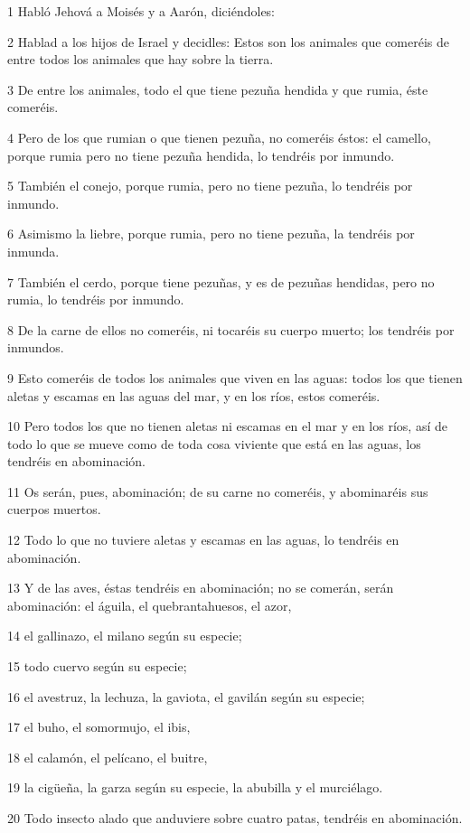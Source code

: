 \par 1 Habló Jehová a Moisés y a Aarón, diciéndoles:
\par 2 Hablad a los hijos de Israel y decidles: Estos son los animales que comeréis de entre todos los animales que hay sobre la tierra.
\par 3 De entre los animales, todo el que tiene pezuña hendida y que rumia, éste comeréis.
\par 4 Pero de los que rumian o que tienen pezuña, no comeréis éstos: el camello, porque rumia pero no tiene pezuña hendida, lo tendréis por inmundo.
\par 5 También el conejo, porque rumia, pero no tiene pezuña, lo tendréis por inmundo.
\par 6 Asimismo la liebre, porque rumia, pero no tiene pezuña, la tendréis por inmunda.
\par 7 También el cerdo, porque tiene pezuñas, y es de pezuñas hendidas, pero no rumia, lo tendréis por inmundo.
\par 8 De la carne de ellos no comeréis, ni tocaréis su cuerpo muerto; los tendréis por inmundos.
\par 9 Esto comeréis de todos los animales que viven en las aguas: todos los que tienen aletas y escamas en las aguas del mar, y en los ríos, estos comeréis.
\par 10 Pero todos los que no tienen aletas ni escamas en el mar y en los ríos, así de todo lo que se mueve como de toda cosa viviente que está en las aguas, los tendréis en abominación.
\par 11 Os serán, pues, abominación; de su carne no comeréis, y abominaréis sus cuerpos muertos.
\par 12 Todo lo que no tuviere aletas y escamas en las aguas, lo tendréis en abominación.
\par 13 Y de las aves, éstas tendréis en abominación; no se comerán, serán abominación: el águila, el quebrantahuesos, el azor,
\par 14 el gallinazo, el milano según su especie;
\par 15 todo cuervo según su especie;
\par 16 el avestruz, la lechuza, la gaviota, el gavilán según su especie;
\par 17 el buho, el somormujo, el ibis,
\par 18 el calamón, el pelícano, el buitre,
\par 19 la cigüeña, la garza según su especie, la abubilla y el murciélago.
\par 20 Todo insecto alado que anduviere sobre cuatro patas, tendréis en abominación.
